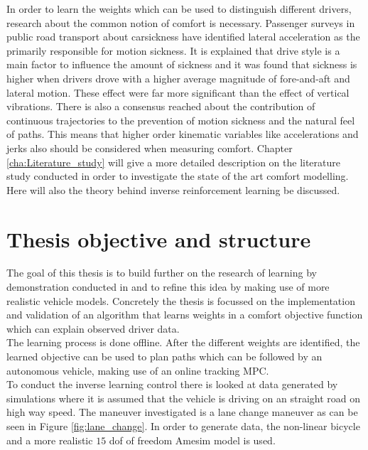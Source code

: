 In order to learn the weights which can be used to distinguish different drivers, research about the common notion of comfort is necessary. Passenger surveys in public road transport about carsickness \cite{Turner1999} have identified lateral acceleration as the primarily responsible for motion sickness. It is explained that drive style is a main factor to influence the amount of sickness and it was found that sickness is higher when drivers drove with a higher average magnitude of fore-and-aft and lateral motion. These effect were far more significant than the effect of vertical vibrations. There is also a consensus reached about the contribution of continuous trajectories to the prevention of motion sickness and the natural feel of paths.\cite{Elbanhawi2015} This means that higher order kinematic variables like accelerations and jerks also should be considered when measuring comfort. Chapter \ref{cha:Literature_study} will give a more detailed description on the literature study conducted in order to investigate the state of the art comfort modelling. Here will also the theory behind inverse reinforcement learning be discussed.\\

\section{Thesis objective and structure}
The goal of this thesis is to build further on the research of learning by demonstration conducted in \cite{Kuderer2015a} and to refine this idea by making use of more realistic vehicle models. Concretely the thesis is focussed on the implementation and validation of an algorithm that learns weights in a comfort objective function which can explain observed driver data.\\
The learning process is done offline. After the different weights are identified, the learned objective can be used to plan paths which can be followed by an autonomous vehicle, making use of an online tracking MPC.\\

To conduct the inverse learning control there is looked at data generated by simulations where it is assumed that the vehicle is driving on an straight road on high way speed. The maneuver investigated is a lane change maneuver as can be seen in Figure \ref{fig:lane_change}. In order to generate data, the non-linear bicycle and a more realistic $15$ dof of freedom Amesim model is used.\\

